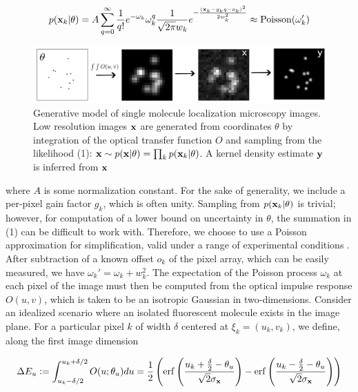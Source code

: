 \documentclass{article}
\begin{document}
\begin{equation}
p(\bold{x}_{k}|\theta) = A\sum_{q=0}^{\infty} \frac{1}{q!}e^{-\omega_{k}}\omega_{k}^{q}\frac{1}{\sqrt{2\pi}w_{k}}e^{-\frac{(\bold{x}_{k}-g_{k}q-o_{k})^2}{2 w_{k}^{2}}} \approx \mathrm{Poisson}(\omega_{k}')
\end{equation}


\begin{figure}
\includegraphics[scale=0.225]{media/Generation.png}
\caption{Generative model of single molecule localization microscopy images. Low resolution images $\bold{x}$ are generated from coordinates $\theta$ by integration of the optical transfer function $O$ and sampling from the likelihood (1): $\bold{x}\sim p(\bold{x}|\theta) = \prod_{k} p(\bold{x}_k|\theta)$. A kernel density estimate $\bold{y}$ is inferred from $\bold{x}$}
\end{figure}

where $A$ is some normalization constant. For the sake of generality, we include a per-pixel gain factor $g_{k}$, which is often unity. Sampling from $p(\bold{x}_{k}|\theta)$ is trivial; however, for computation of a lower bound on uncertainty in $\theta$, the summation in (1) can be difficult to work with. Therefore, we choose to use a Poisson approximation for simplification, valid under a range of experimental conditions \citep{Huang2013}. After subtraction of a known offset $o_{k}$ of the pixel array, which can be easily measured, we have $\omega_{k}' = \omega_{k} + w_{k}^{2}$. The expectation of the Poisson process $\omega_{k}$ at each pixel of the image must then be computed from the optical impulse response $O(u,v)$, which is taken to be an isotropic Gaussian in two-dimensions. Consider an idealized scenario where an isolated fluorescent molecule exists in the image plane. For a particular pixel $k$ of width $\delta$ centered at $\xi_{k}=(u_k,v_k)$, we define, along the first image dimension

\begin{equation}
\Delta E_{u} \vcentcolon = \int_{u_{k}-\delta /2}^{u_{k}+\delta /2} O(u;\theta_{u})du = \frac{1}{2}\left(\mathrm{erf}\left(\frac{u_{k}+\frac{\delta}{2}-\theta_{u}}{\sqrt{2}\sigma_{\bold{x}}}\right) -\mathrm{erf}\left(\frac{u_{k}-\frac{\delta}{2}-\theta_{u}}{\sqrt{2}\sigma_{\bold{x}}}\right)\right)
\end{equation}
\end{document}
